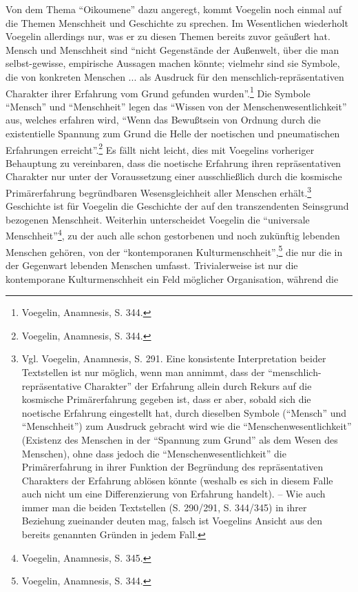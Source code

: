 Von dem Thema "`Oikoumene"' dazu angeregt, kommt Voegelin noch einmal auf die
Themen Menschheit und Geschichte zu sprechen. Im Wesentlichen wiederholt
Voegelin allerdings nur, was er zu diesen Themen bereits zuvor geäußert hat.
Mensch und Menschheit sind "`nicht Gegenstände der Außenwelt, über die man
selbst-gewisse, empirische Aussagen machen könnte; vielmehr sind sie Symbole,
die von konkreten Menschen ... als Ausdruck für den menschlich-repräsentativen
Charakter ihrer Erfahrung vom Grund gefunden wurden"'.\footnote{Voegelin,
  Anamnesis, S. 344.} Die Symbole "`Mensch"' und "`Menschheit"' legen das
"`Wissen von der Menschenwesentlichkeit"' aus, welches erfahren wird, "`Wenn
das Bewußtsein von Ordnung durch die existentielle Spannung zum Grund die
Helle der noetischen und pneumatischen Erfahrungen
erreicht"'.\footnote{Voegelin, Anamnesis, S. 344.} Es fällt nicht leicht, dies
mit Voegelins vorheriger Behauptung zu vereinbaren, dass die noetische
Erfahrung ihren repräsentativen Charakter nur unter der Voraussetzung einer
ausschließlich durch die kosmische Primärerfahrung begründbaren
Wesensgleichheit aller Menschen erhält.\footnote{Vgl. Voegelin, Anamnesis, S.
  291. Eine konsistente Interpretation beider Textstellen ist nur möglich,
  wenn man annimmt, dass der "`menschlich-repräsentative Charakter"' der
  Erfahrung allein durch Rekurs auf die kosmische Primärerfahrung gegeben ist,
  dass er aber, sobald sich die noetische Erfahrung eingestellt hat, durch
  dieselben Symbole ("`Mensch"' und "`Menschheit"') zum Ausdruck gebracht wird
  wie die "`Menschenwesentlichkeit"' (Existenz des Menschen in der "`Spannung
  zum Grund"' als dem Wesen des Menschen), ohne dass jedoch die
  "`Menschenwesentlichkeit"' die Primärerfahrung in ihrer Funktion der
  Begründung des repräsentativen Charakters der Erfahrung ablösen könnte
  (weshalb es sich in diesem Falle auch nicht um eine Differenzierung von
  Erfahrung handelt). -- Wie auch immer man die beiden Textstellen (S. 290/291,
  S. 344/345) in ihrer Beziehung zueinander deuten mag, falsch ist Voegelins
  Ansicht aus den bereits genannten Gründen in jedem Fall.} Geschichte ist für
Voegelin die Geschichte der auf den transzendenten Seinsgrund bezogenen
Menschheit. Weiterhin unterscheidet Voegelin die "`universale
Menschheit"'\footnote{Voegelin, Anamnesis, S. 345.}, zu der auch alle schon
gestorbenen und noch zukünftig lebenden Menschen gehören, von der
"`kontemporanen Kulturmenschheit"',\footnote{Voegelin, Anamnesis, S. 344.} die
nur die in der Gegenwart lebenden Menschen umfasst. Trivialerweise ist nur die
kontemporane Kulturmenschheit ein Feld möglicher Organisation, während die
